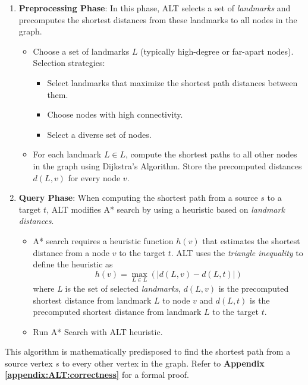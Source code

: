 			\begin{enumerate}
				\item \textbf{Preprocessing Phase}: In this phase, ALT selects a set of \textit{landmarks} and precomputes the shortest distances from these landmarks to all nodes in the graph.
				\begin{itemize}
					\item Choose a set of landmarks $ \textit{L} $ (typically high-degree or far-apart nodes).  Selection strategies:
					\begin{itemize}
						\item Select landmarks that maximize the shortest path distances between them.
						\item Choose nodes with high connectivity.
						\item Select a diverse set of nodes.
					\end{itemize}
					\item For each landmark $ L \in \textit{L} $, compute the shortest paths to all other nodes in the graph using Dijkstra’s Algorithm. Store the precomputed distances $d(L, v)$ for every node $v$.
				\end{itemize}
				\item \textbf{Query Phase}: When computing the shortest path from a source $s$ to a target $t$, ALT modifies A* search by using a heuristic based on \textit{landmark distances}.
					\begin{itemize}
						\item A* search requires a heuristic function $ h(v) $ that estimates the shortest distance from a node $ v $ to the target $ t $. ALT uses the \textit{triangle inequality} to define the heuristic as
						\begin{equation*}
							h(v) = \max_{L \in \textit{L}} \left( \left| d(L, v) - d(L, t) \right| \right)
						\end{equation*}
						where \textit{L}  is the set of selected \textit{landmarks}, $d(L, v)$ is the precomputed shortest distance from landmark $L$ to node $v$ and $d(L, t)$ is the precomputed shortest distance from landmark $L$ to the target $t$.
						\item Run A* Search with ALT heuristic.
					\end{itemize}
			\end{enumerate}
			This algorithm is mathematically predisposed to find the shortest path from a source vertex $s$ to every other vertex in the graph.
			Refer to \textbf{ Appendix \ref{appendix:ALT:correctness}} for a formal proof.
